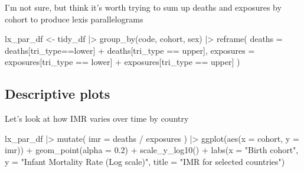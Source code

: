 \documentclass[
  letterpaper,
  DIV=11,
  numbers=noendperiod]{scrartcl}
\newenvironment{Shaded}{\begin{snugshade}}{\end{snugshade}}
\newcommand{\AttributeTok}[1]{\textcolor[rgb]{0.40,0.45,0.13}{#1}}
\newcommand{\FloatTok}[1]{\textcolor[rgb]{0.68,0.00,0.00}{#1}}
\newcommand{\FunctionTok}[1]{\textcolor[rgb]{0.28,0.35,0.67}{#1}}
\newcommand{\NormalTok}[1]{\textcolor[rgb]{0.00,0.23,0.31}{#1}}
\newcommand{\OtherTok}[1]{\textcolor[rgb]{0.00,0.23,0.31}{#1}}
\newcommand{\SpecialCharTok}[1]{\textcolor[rgb]{0.37,0.37,0.37}{#1}}
\newcommand{\StringTok}[1]{\textcolor[rgb]{0.13,0.47,0.30}{#1}}
\begin{document}
I'm not sure, but think it's worth trying to sum up deaths and exposures
by cohort to produce lexis parallelograms

\begin{Shaded}
\begin{Highlighting}[]
\NormalTok{lx\_par\_df }\OtherTok{\textless{}{-}} 
\NormalTok{  tidy\_df }\SpecialCharTok{|\textgreater{}} 
    \FunctionTok{group\_by}\NormalTok{(code, cohort, sex) }\SpecialCharTok{|\textgreater{}} 
    \FunctionTok{reframe}\NormalTok{(}
      \AttributeTok{deaths =}\NormalTok{ deaths[tri\_type}\SpecialCharTok{==}\StringTok{\textquotesingle{}lower\textquotesingle{}}\NormalTok{] }\SpecialCharTok{+}\NormalTok{ deaths[tri\_type }\SpecialCharTok{==} \StringTok{\textquotesingle{}upper\textquotesingle{}}\NormalTok{],}
      \AttributeTok{exposures =}\NormalTok{ exposures[tri\_type }\SpecialCharTok{==} \StringTok{\textquotesingle{}lower\textquotesingle{}}\NormalTok{] }\SpecialCharTok{+}\NormalTok{ exposures[tri\_type }\SpecialCharTok{==} \StringTok{\textquotesingle{}upper\textquotesingle{}}\NormalTok{]}
\NormalTok{    )}
\end{Highlighting}
\end{Shaded}

\hypertarget{descriptive-plots}{%
\subsection{Descriptive plots}\label{descriptive-plots}}

Let's look at how IMR varies over time by country

\begin{Shaded}
\begin{Highlighting}[]
\NormalTok{lx\_par\_df }\SpecialCharTok{|\textgreater{}} 
  \FunctionTok{mutate}\NormalTok{(}
    \AttributeTok{imr =}\NormalTok{ deaths }\SpecialCharTok{/}\NormalTok{ exposures}
\NormalTok{  ) }\SpecialCharTok{|\textgreater{}} 
  \FunctionTok{ggplot}\NormalTok{(}\FunctionTok{aes}\NormalTok{(}\AttributeTok{x =}\NormalTok{ cohort, }\AttributeTok{y =}\NormalTok{ imr)) }\SpecialCharTok{+} 
  \FunctionTok{geom\_point}\NormalTok{(}\AttributeTok{alpha =} \FloatTok{0.2}\NormalTok{) }\SpecialCharTok{+} 
  \FunctionTok{scale\_y\_log10}\NormalTok{() }\SpecialCharTok{+} 
  \FunctionTok{labs}\NormalTok{(}\AttributeTok{x =} \StringTok{"Birth cohort"}\NormalTok{, }\AttributeTok{y =} \StringTok{"Infant Mortality Rate (Log scale)"}\NormalTok{,}
       \AttributeTok{title =} \StringTok{"IMR for selected countries"}\NormalTok{)}
\end{Highlighting}
\end{Shaded}
\end{document}
